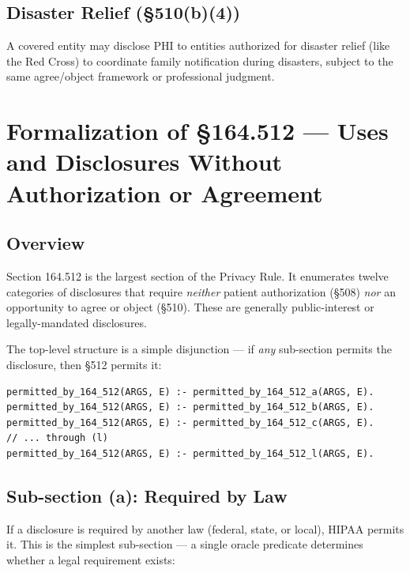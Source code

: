 \documentclass[11pt,letterpaper]{article}
\begin{document}
\subsection{Disaster Relief (\S 510(b)(4))}

A covered entity may disclose PHI to entities authorized for disaster relief (like the Red Cross) to coordinate family notification during disasters, subject to the same agree/object framework or professional judgment.


\section{Formalization of \S 164.512 --- Uses and Disclosures Without Authorization or Agreement}
\label{sec:512}

\subsection{Overview}

Section 164.512 is the largest section of the Privacy Rule. It enumerates twelve categories of disclosures that require \emph{neither} patient authorization (\S 508) \emph{nor} an opportunity to agree or object (\S 510). These are generally public-interest or legally-mandated disclosures.

The top-level structure is a simple disjunction --- if \emph{any} sub-section permits the disclosure, then \S 512 permits it:

\begin{lstlisting}[style=soufflestyle,caption={Top-level \S 512 disjunction (from hipaa\_164\_512.dl)}]
permitted_by_164_512(ARGS, E) :- permitted_by_164_512_a(ARGS, E).
permitted_by_164_512(ARGS, E) :- permitted_by_164_512_b(ARGS, E).
permitted_by_164_512(ARGS, E) :- permitted_by_164_512_c(ARGS, E).
// ... through (l)
permitted_by_164_512(ARGS, E) :- permitted_by_164_512_l(ARGS, E).
\end{lstlisting}

\subsection{Sub-section (a): Required by Law}

If a disclosure is required by another law (federal, state, or local), HIPAA permits it. This is the simplest sub-section --- a single oracle predicate determines whether a legal requirement exists:
\end{document}

